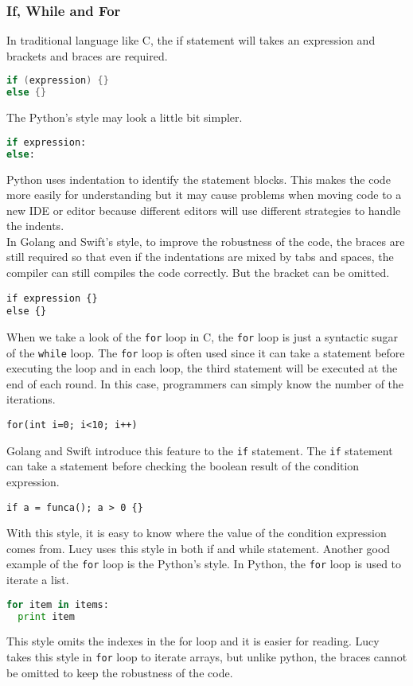 \subsubsection{If, While and For}
In traditional language like C, the if statement will takes an expression and brackets and braces are required.
\begin{lstlisting}[language=c]
if (expression) {}
else {}
\end{lstlisting}
The Python's style may look a little bit simpler.
\begin{lstlisting}[language=python]
if expression:
else:
\end{lstlisting}
Python uses indentation to identify the statement blocks. This makes the code more easily for understanding but it may cause problems when moving code to a new IDE or editor because different editors will use different strategies to handle the indents. \\
In Golang and Swift's style, to improve the robustness of the code, the braces are still required so that even if the indentations are mixed by tabs and spaces, the compiler can still compiles the code correctly. But the bracket can be omitted.
\begin{lstlisting}
if expression {}
else {}
\end{lstlisting}
When we take a look of the \texttt{for} loop in C, the \texttt{for} loop is just a syntactic sugar of the \texttt{while} loop. The \texttt{for} loop is often used since it can take a statement before executing the loop and in each loop, the third statement will be executed at the end of each round. In this case, programmers can simply know the number of the iterations.
\begin{lstlisting}
for(int i=0; i<10; i++)
\end{lstlisting}
Golang and Swift introduce this feature to the \texttt{if} statement. The \texttt{if} statement can take a statement before checking the boolean result of the condition expression.
\begin{lstlisting}
if a = funca(); a > 0 {}
\end{lstlisting}
With this style, it is easy to know where the value of the condition expression comes from. Lucy uses this style in both if and while statement.
Another good example of the \texttt{for} loop is the Python's style. In Python, the \texttt{for} loop is used to iterate a list.
\begin{lstlisting}[language=python]
for item in items:
  print item
\end{lstlisting}
This style omits the indexes in the for loop and it is easier for reading. Lucy takes this style in \texttt{for} loop to iterate arrays, but unlike python, the braces cannot be omitted to keep the robustness of the code.

